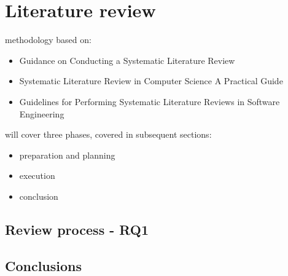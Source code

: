 \section{Literature review}\label{sec:literature-review}

methodology based on:
\begin{itemize}
    \item Guidance on Conducting a Systematic Literature Review~\cite{xiao_guidance_2019}
    \item Systematic Literature Review in Computer Science \textendash A Practical Guide~\cite{neiva_systematic_2016}
    \item Guidelines for Performing Systematic Literature Reviews in Software Engineering~\cite{kitchenham_guidelines_2007}
\end{itemize}

will cover three phases, covered in subsequent sections:
\begin{itemize}
    \item preparation and planning
    \item execution
    \item conclusion
\end{itemize}



\subsection{Review process - RQ1}\label{subsec:review-process---rq1}

\subsection{Conclusions}\label{subsec:conclusions}
